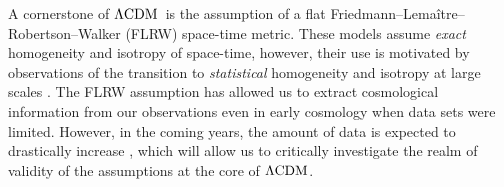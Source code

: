 \documentclass[fleqn,usenatbib]{mnras}
\newcommand{\lcdm}{$\Lambda\rm{CDM}$} %
\begin{document}
A cornerstone of \lcdm\ is the assumption of a flat Friedmann–Lema\^itre–Robertson–Walker (FLRW) {space-time} metric. {These models assume \textit{exact} homogeneity and isotropy of space-time, however, their use is motivated by observations of the transition to \textit{statistical} homogeneity and isotropy at large scales \citep[e.g.][]{Scrimgeour:2012,Hogg:2005}. } 
{The FLRW assumption has allowed us to extract cosmological information from our observations even in early cosmology when data sets were limited.} %
However, in the coming years, the amount of data is expected to drastically {increase} \citep{LSST_SRD, Hounsell2018,scolnic2019generation, Simons_Observatory_2019}, which will allow us to %
{critically} investigate the {realm of} validity of the %
assumptions at the core of \lcdm.
\end{document}
